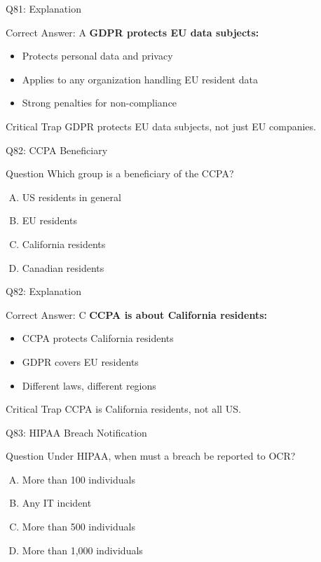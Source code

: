 \documentclass{beamer}
\begin{document}
	\begin{frame}{Q81: Explanation}
		\begin{block}{Correct Answer: A}
			\textbf{GDPR protects EU data subjects:}
			\begin{itemize}
				\item Protects personal data and privacy
				\item Applies to any organization handling EU resident data
				\item Strong penalties for non-compliance
			\end{itemize}
		\end{block}
		\begin{alertblock}{Critical Trap}
			GDPR protects EU data subjects, not just EU companies.
		\end{alertblock}
	\end{frame}
	
	\begin{frame}{Q82: CCPA Beneficiary}
		\begin{block}{Question}
			Which group is a beneficiary of the CCPA?
		\end{block}
		\begin{enumerate}[(A)]
			\item US residents in general
			\item EU residents
			\item California residents
			\item Canadian residents
		\end{enumerate}
	\end{frame}
	
	\begin{frame}{Q82: Explanation}
		\begin{block}{Correct Answer: C}
			\textbf{CCPA is about California residents:}
			\begin{itemize}
				\item CCPA protects California residents
				\item GDPR covers EU residents
				\item Different laws, different regions
			\end{itemize}
		\end{block}
		\begin{alertblock}{Critical Trap}
			CCPA is California residents, not all US.
		\end{alertblock}
	\end{frame}
	
	\begin{frame}{Q83: HIPAA Breach Notification}
		\begin{block}{Question}
			Under HIPAA, when must a breach be reported to OCR?
		\end{block}
		\begin{enumerate}[(A)]
			\item More than 100 individuals
			\item Any IT incident
			\item More than 500 individuals
			\item More than 1,000 individuals
		\end{enumerate}
	\end{frame}
	
\end{document}
